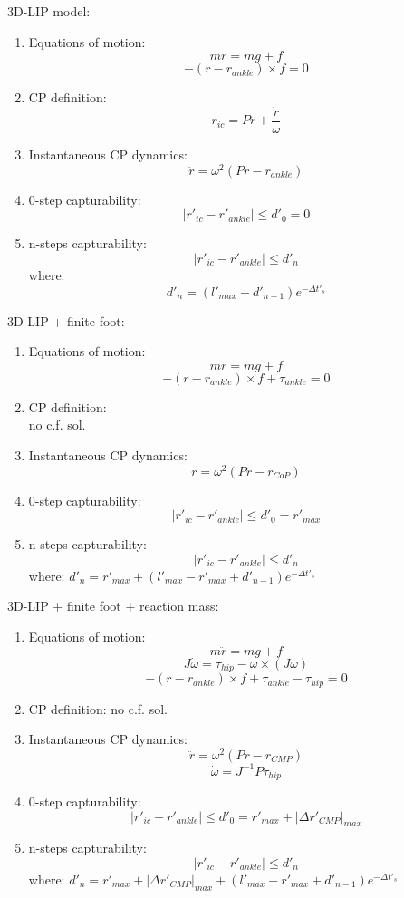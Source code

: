 \begin{multicols}{3}
3D-LIP model:
\begin{enumerate}
\item Equations of motion:
$$ m \ddot{r} = mg + f $$
$$ -(r-r_{ankle})  \times f = 0 $$
\item CP definition:  $$ r_{ic} = P r + \frac{\dot{r}}{\omega} $$
\item Instantaneous CP dynamics: $$ \ddot{r} = \omega^2 (P r - r_{ankle}) $$
\item 0-step capturability:
$$ | r'_{ic} - r'_{ankle}| \le d'_0 = 0 $$
\item n-steps capturability:
$$ | r'_{ic} - r'_{ankle}| \le d'_n $$ where: $$ d'_n = (l'_{max} + d'_{n-1})e^{- \Delta t'_s}$$
\end{enumerate}
\columnbreak
3D-LIP + finite foot:
\begin{enumerate}
\item Equations of motion:
$$ m \ddot{r} = mg + f $$
$$ -(r-r_{ankle})  \times f + \tau_{ankle}= 0 $$
\item CP definition: \\
no c.f. sol.
\item Instantaneous CP dynamics:
$$ \ddot{r} = \omega^2 (P r - r_{CoP}) $$
\item 0-step capturability:
$$ | r'_{ic} - r'_{ankle}| \le d'_0 =  r'_{max} $$
\item n-steps capturability:
$$ | r'_{ic} - r'_{ankle}| \le d'_n $$ where: $ d'_n = r'_{max} + (l'_{max} - r'_{max} + d'_{n-1})e^{- \Delta t'_s}$
\end{enumerate}

\columnbreak
3D-LIP + finite foot + reaction mass:
\begin{enumerate}
\item Equations of motion:
$$ m \ddot{r} = mg + f $$
$$ J \dot{\omega} = \tau_{hip} - \omega \times (J \omega) $$
$$ -(r-r_{ankle})  \times f + \tau_{ankle} - \tau_{hip}= 0 $$
\item CP definition: 
no c.f. sol.
\item Instantaneous CP dynamics: $$ \ddot{r} = \omega^2 (P r - r_{CMP}) $$
$$ \dot{\omega} = J^{-1} P \tau_{hip} $$
\item 0-step capturability:
$$ | r'_{ic} - r'_{ankle}| \le d'_0 = r'_{max} + |\Delta r'_{CMP}|_{max}$$
\item n-steps capturability:
$$ | r'_{ic} - r'_{ankle}| \le d'_n $$ where: $ d'_n = r'_{max} + |\Delta r'_{CMP}|_{max} + (l'_{max} - r'_{max} + d'_{n-1})e^{- \Delta t'_s}$
\end{enumerate}
\end{multicols}

